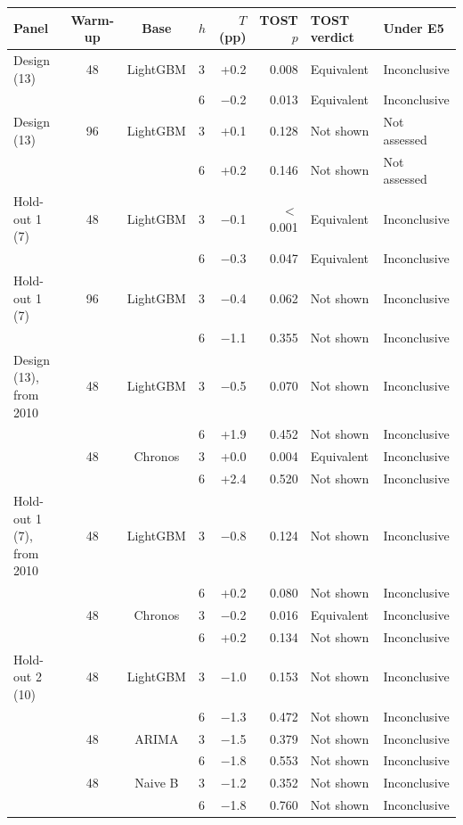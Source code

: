 \begin{tabular}{lcclrrll}
\toprule
Panel & Warm-up & Base & $h$ & $T$ (pp) & TOST $p$ & TOST verdict & Under E5 \\
\midrule
Design (13) & 48 & LightGBM & 3 & +0.2 & 0.008 & Equivalent & Inconclusive \\
 &  &  & 6 & $-$0.2 & 0.013 & Equivalent & Inconclusive \\
\midrule
Design (13) & 96 & LightGBM & 3 & +0.1 & 0.128 & Not shown & Not assessed \\
 &  &  & 6 & +0.2 & 0.146 & Not shown & Not assessed \\
\midrule
Hold-out 1 (7) & 48 & LightGBM & 3 & $-$0.1 & $<$0.001 & Equivalent & Inconclusive \\
 &  &  & 6 & $-$0.3 & 0.047 & Equivalent & Inconclusive \\
\midrule
Hold-out 1 (7) & 96 & LightGBM & 3 & $-$0.4 & 0.062 & Not shown & Inconclusive \\
 &  &  & 6 & $-$1.1 & 0.355 & Not shown & Inconclusive \\
\midrule
Design (13), from 2010 & 48 & LightGBM & 3 & $-$0.5 & 0.070 & Not shown & Inconclusive \\
 &  &  & 6 & +1.9 & 0.452 & Not shown & Inconclusive \\
 & 48 & Chronos & 3 & +0.0 & 0.004 & Equivalent & Inconclusive \\
 &  &  & 6 & +2.4 & 0.520 & Not shown & Inconclusive \\
\midrule
Hold-out 1 (7), from 2010 & 48 & LightGBM & 3 & $-$0.8 & 0.124 & Not shown & Inconclusive \\
 &  &  & 6 & +0.2 & 0.080 & Not shown & Inconclusive \\
 & 48 & Chronos & 3 & $-$0.2 & 0.016 & Equivalent & Inconclusive \\
 &  &  & 6 & +0.2 & 0.134 & Not shown & Inconclusive \\
\midrule
Hold-out 2 (10) & 48 & LightGBM & 3 & $-$1.0 & 0.153 & Not shown & Inconclusive \\
 &  &  & 6 & $-$1.3 & 0.472 & Not shown & Inconclusive \\
 & 48 & ARIMA & 3 & $-$1.5 & 0.379 & Not shown & Inconclusive \\
 &  &  & 6 & $-$1.8 & 0.553 & Not shown & Inconclusive \\
 & 48 & Naive B & 3 & $-$1.2 & 0.352 & Not shown & Inconclusive \\
 &  &  & 6 & $-$1.8 & 0.760 & Not shown & Inconclusive \\

\end{tabular}
